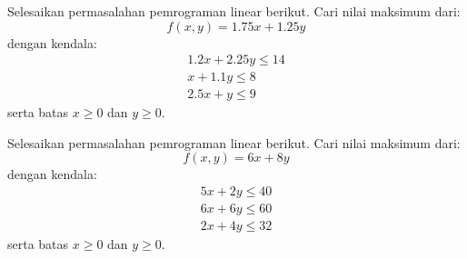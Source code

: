 \begin{soal}
Selesaikan permasalahan pemrograman linear berikut.
Cari nilai maksimum dari:
\begin{equation*}
f(x,y) = 1.75x + 1.25y
\end{equation*}
dengan kendala:
\begin{align*}
1.2x + 2.25y \leq 14 \\
x + 1.1y \leq 8 \\
2.5x + y \leq 9
\end{align*}
serta batas $x \geq 0$ dan $y \geq 0$.
\end{soal}


\begin{soal}
Selesaikan permasalahan pemrograman linear berikut.
Cari nilai maksimum dari:
\begin{equation*}
f(x,y) = 6x + 8y
\end{equation*}
dengan kendala:
\begin{align*}
5x + 2y \leq 40 \\
6x + 6y \leq 60 \\
2x + 4y \leq 32
\end{align*}
serta batas $x \geq 0$ dan $y \geq 0$.
\end{soal}